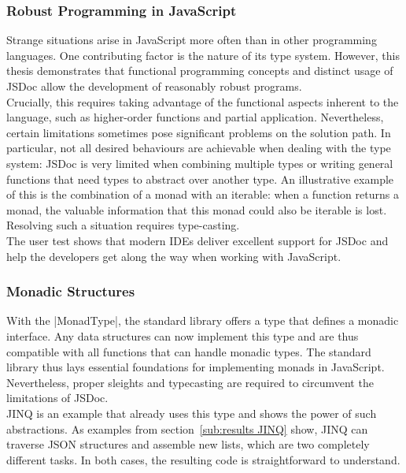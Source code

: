 \subsubsection{Robust Programming in JavaScript}
\label{subsub:Robust Programming in JavaScript}
Strange situations arise in JavaScript more often than in other programming
languages. One contributing factor is the nature of its type system. However,
this thesis demonstrates that functional programming concepts and distinct
usage of JSDoc allow the development of reasonably robust programs.\\
Crucially, this requires taking advantage of the functional aspects inherent to
the language, such as higher-order functions and partial application.
Nevertheless, certain limitations sometimes pose significant problems on the
solution path. In particular, not all desired behaviours are achievable when
dealing with the type system: JSDoc is very limited when combining multiple
types or writing general functions that need types to abstract over another
type. An illustrative example of this is the combination of a monad with an
iterable: when a function returns a monad, the valuable information
that this monad could also be iterable is lost. Resolving such a situation
requires type-casting.\\ 
The user test shows that modern IDEs deliver excellent support for JSDoc and
help the developers get along the way when working with JavaScript.
\subsubsection{Monadic Structures}
\label{subsub:Monadic Structures}
With the |MonadType|, the standard library offers a type that defines a monadic
interface. Any data structures can now implement this type and are thus
compatible with all functions that can handle monadic types. The standard
library thus lays essential foundations for implementing monads in JavaScript.
Nevertheless, proper sleights and typecasting are required to circumvent the
limitations of JSDoc.\\
JINQ is an example that already uses this type and shows the power of such
abstractions. As examples from section~\ref{sub:results JINQ} show, JINQ can
traverse JSON structures and assemble new lists, which are two completely
different tasks. In both cases, the resulting code is straightforward to
understand.

